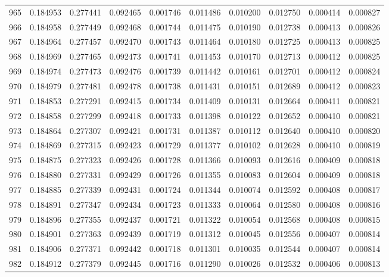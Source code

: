 \begin{tabular}{lrrrrrrrrr}
965 & 0.184953 & 0.277441 & 0.092465 & 0.001746 & 0.011486 & 0.010200 & 0.012750 & 0.000414 & 0.000827 \\
966 & 0.184958 & 0.277449 & 0.092468 & 0.001744 & 0.011475 & 0.010190 & 0.012738 & 0.000413 & 0.000826 \\
967 & 0.184964 & 0.277457 & 0.092470 & 0.001743 & 0.011464 & 0.010180 & 0.012725 & 0.000413 & 0.000825 \\
968 & 0.184969 & 0.277465 & 0.092473 & 0.001741 & 0.011453 & 0.010170 & 0.012713 & 0.000412 & 0.000825 \\
969 & 0.184974 & 0.277473 & 0.092476 & 0.001739 & 0.011442 & 0.010161 & 0.012701 & 0.000412 & 0.000824 \\
970 & 0.184979 & 0.277481 & 0.092478 & 0.001738 & 0.011431 & 0.010151 & 0.012689 & 0.000412 & 0.000823 \\
971 & 0.184853 & 0.277291 & 0.092415 & 0.001734 & 0.011409 & 0.010131 & 0.012664 & 0.000411 & 0.000821 \\
972 & 0.184858 & 0.277299 & 0.092418 & 0.001733 & 0.011398 & 0.010122 & 0.012652 & 0.000410 & 0.000821 \\
973 & 0.184864 & 0.277307 & 0.092421 & 0.001731 & 0.011387 & 0.010112 & 0.012640 & 0.000410 & 0.000820 \\
974 & 0.184869 & 0.277315 & 0.092423 & 0.001729 & 0.011377 & 0.010102 & 0.012628 & 0.000410 & 0.000819 \\
975 & 0.184875 & 0.277323 & 0.092426 & 0.001728 & 0.011366 & 0.010093 & 0.012616 & 0.000409 & 0.000818 \\
976 & 0.184880 & 0.277331 & 0.092429 & 0.001726 & 0.011355 & 0.010083 & 0.012604 & 0.000409 & 0.000818 \\
977 & 0.184885 & 0.277339 & 0.092431 & 0.001724 & 0.011344 & 0.010074 & 0.012592 & 0.000408 & 0.000817 \\
978 & 0.184891 & 0.277347 & 0.092434 & 0.001723 & 0.011333 & 0.010064 & 0.012580 & 0.000408 & 0.000816 \\
979 & 0.184896 & 0.277355 & 0.092437 & 0.001721 & 0.011322 & 0.010054 & 0.012568 & 0.000408 & 0.000815 \\
980 & 0.184901 & 0.277363 & 0.092439 & 0.001719 & 0.011312 & 0.010045 & 0.012556 & 0.000407 & 0.000814 \\
981 & 0.184906 & 0.277371 & 0.092442 & 0.001718 & 0.011301 & 0.010035 & 0.012544 & 0.000407 & 0.000814 \\
982 & 0.184912 & 0.277379 & 0.092445 & 0.001716 & 0.011290 & 0.010026 & 0.012532 & 0.000406 & 0.000813 \\

\end{tabular}
